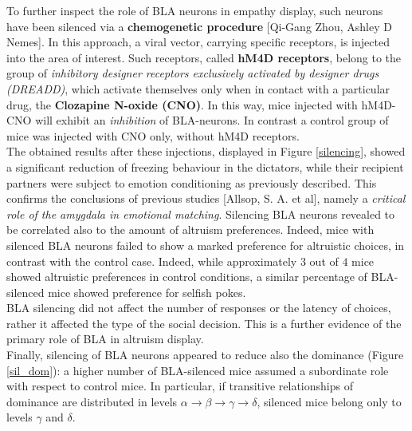 \documentclass[12pt, a4paper]{article}
\begin{document}
To further inspect the role of BLA neurons in empathy display, such neurons have been silenced via a \textbf{chemogenetic procedure} [Qi-Gang Zhou, Ashley D Nemes]. In this approach, a viral vector, carrying specific receptors, is injected into the area of interest. Such receptors, called  \textbf{hM4D receptors}, belong to the group of \textit{inhibitory designer receptors exclusively activated by designer drugs (DREADD)}, which activate themselves only when in contact with a particular drug, the \textbf{Clozapine N-oxide (CNO)}. In this way, mice injected with hM4D-CNO will exhibit an \textit{inhibition} of BLA-neurons. In contrast a control group of mice was injected with CNO only, without hM4D receptors.\\
The obtained results after these injections, displayed in Figure \ref{silencing}, showed a significant reduction of freezing behaviour in the dictators, while their recipient partners were subject to emotion conditioning as previously described. This confirms the conclusions of previous studies [Allsop, S. A. et al], namely a \textit{critical role of the amygdala in emotional matching}. Silencing BLA neurons revealed to be correlated also to the amount of altruism preferences. Indeed, mice with silenced BLA neurons failed to show a marked preference for altruistic choices, in contrast with the control case. Indeed, while approximately $3$ out of $4$ mice showed altruistic preferences in control conditions, a similar percentage of BLA-silenced mice showed preference for selfish pokes.\\
BLA silencing did not affect the number of responses or the latency of choices, rather it affected the type of the social decision. This is a further evidence of the primary role of BLA in altruism display.
\\
Finally,  silencing of BLA neurons appeared to reduce also the dominance (Figure \ref{sil_dom}): a higher number of BLA-silenced mice assumed a subordinate role with respect to control mice. In particular, if transitive relationships of dominance are distributed in levels $ \alpha \rightarrow \beta \rightarrow \gamma \rightarrow \delta $, silenced mice belong only to levels $ \gamma $ and $ \delta $.
\end{document}
